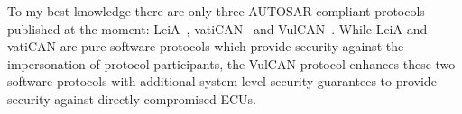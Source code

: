 To my best knowledge there are only three AUTOSAR-compliant protocols published
at the moment: LeiA~\cite{Radu2016}, vatiCAN~\cite{Nurnberger2016} and
VulCAN~\cite{VanBulck2017}. While LeiA and vatiCAN are pure software protocols
which provide security against the impersonation of protocol participants, the
VulCAN protocol enhances these two software protocols with additional
system-level security guarantees to provide security against directly
compromised ECUs.

